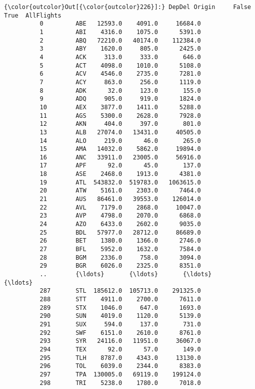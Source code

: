 \documentclass[11pt]{article}
\begin{document}
\begin{Verbatim}[commandchars=\\\{\}]
{\color{outcolor}Out[{\color{outcolor}226}]:} DepDel Origin     False      True  AllFlights
          0         ABE   12593.0    4091.0     16684.0
          1         ABI    4316.0    1075.0      5391.0
          2         ABQ   72210.0   40174.0    112384.0
          3         ABY    1620.0     805.0      2425.0
          4         ACK     313.0     333.0       646.0
          5         ACT    4098.0    1010.0      5108.0
          6         ACV    4546.0    2735.0      7281.0
          7         ACY     863.0     256.0      1119.0
          8         ADK      32.0     123.0       155.0
          9         ADQ     905.0     919.0      1824.0
          10        AEX    3877.0    1411.0      5288.0
          11        AGS    5300.0    2628.0      7928.0
          12        AKN     404.0     397.0       801.0
          13        ALB   27074.0   13431.0     40505.0
          14        ALO     219.0      46.0       265.0
          15        AMA   14032.0    5862.0     19894.0
          16        ANC   33911.0   23005.0     56916.0
          17        APF      92.0      45.0       137.0
          18        ASE    2468.0    1913.0      4381.0
          19        ATL  543832.0  519783.0   1063615.0
          20        ATW    5161.0    2303.0      7464.0
          21        AUS   86461.0   39553.0    126014.0
          22        AVL    7179.0    2868.0     10047.0
          23        AVP    4798.0    2070.0      6868.0
          24        AZO    6433.0    2602.0      9035.0
          25        BDL   57977.0   28712.0     86689.0
          26        BET    1380.0    1366.0      2746.0
          27        BFL    5952.0    1632.0      7584.0
          28        BGM    2336.0     758.0      3094.0
          29        BGR    6026.0    2325.0      8351.0
          ..        {\ldots}       {\ldots}       {\ldots}         {\ldots}
          287       STL  185612.0  105713.0    291325.0
          288       STT    4911.0    2700.0      7611.0
          289       STX    1046.0     647.0      1693.0
          290       SUN    4019.0    1120.0      5139.0
          291       SUX     594.0     137.0       731.0
          292       SWF    6151.0    2610.0      8761.0
          293       SYR   24116.0   11951.0     36067.0
          294       TEX      92.0      57.0       149.0
          295       TLH    8787.0    4343.0     13130.0
          296       TOL    6039.0    2344.0      8383.0
          297       TPA  130005.0   69119.0    199124.0
          298       TRI    5238.0    1780.0      7018.0

\end{Verbatim}
\end{document}
